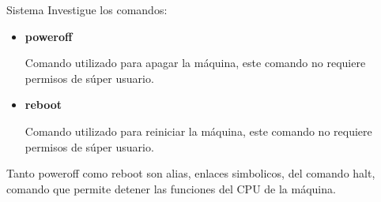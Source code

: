 \begin{section}{Sistema}
	Investigue los comandos:

	\begin{itemize}

	\item \textbf{poweroff}

		Comando utilizado para apagar la máquina, este comando no requiere permisos de súper usuario.

	\item \textbf{reboot}

		Comando utilizado para reiniciar la máquina, este comando no requiere permisos de súper usuario.
	\end{itemize}

Tanto poweroff como reboot son alias, enlaces simbolicos, del comando halt, comando que permite detener las funciones del CPU de la máquina.
\end{section}